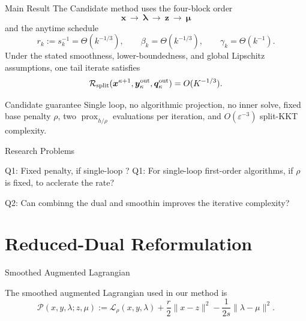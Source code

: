 \documentclass[handout,compress,9pt]{beamer}
\newcommand{\bx}{\bm{x}}
\newcommand{\by}{\bm{y}}
\newcommand{\bz}{\bm{z}}
\newcommand{\bq}{\bm{q}}
\newcommand{\bmu}{\bm{\mu}}
\newcommand{\blmbd}{\bm{\lambda}}
\newcommand{\calA}{\mathcal{A}}
\newcommand{\prox}{\operatorname{prox}}
\newcommand{\eps}{\varepsilon}
\begin{document}
\begin{frame}{Main Result}
\small
The Candidate method uses the four-block order
\begin{equation*}
  \boxed{\bx\ \longrightarrow\ \blmbd\ \longrightarrow\ \bz\ \longrightarrow\ \bmu}
\end{equation*}
and the anytime schedule
\begin{equation*}
  r_k:=s_k^{-1}=\Theta(k^{-1/3}),
  \qquad
  \beta_k=\Theta(k^{-1/3}),
  \qquad
  \gamma_k=\Theta(k^{-1}).
\end{equation*}
Under the stated smoothness, lower-boundedness, and global Lipschitz
assumptions, one tail iterate satisfies
\begin{equation*}
  \mathcal R_{\rm split}
  (\bx^{\kappa+1},\by_\kappa^{\rm out},\bq_\kappa^{\rm out})
  =O(K^{-1/3}).
\end{equation*}
\begin{block}{Candidate guarantee}
Single loop, no algorithmic projection, no inner solve, fixed base penalty
$\rho$, two $\prox_{h/\rho}$ evaluations per iteration, and
$O(\eps^{-3})$ split-KKT complexity.
\end{block}
\end{frame}

\begin{frame}{Research Problems}

 Q1: Fixed penalty, if single-loop ?
  Q1: For single-loop first-order algorithms, if $\rho$ is fixed, to acclerate the rate?

  Q2: Can combinng the dual and smoothin improves the iterative complexity?
\end{frame}

\section{Reduced-Dual Reformulation}

\begin{frame}{Smoothed Augmented Lagrangian}

The smoothed augmented Lagrangian used in our method is
\[
{\mathcal P}(x,y,\lambda;z,\mu)
:=
\mathcal L_\rho(x,y,\lambda)
+\frac{r}{2}\|x-z\|^2
-\frac{1}{2s}\|\lambda-\mu\|^2.
\]


\end{frame}
\end{document}
